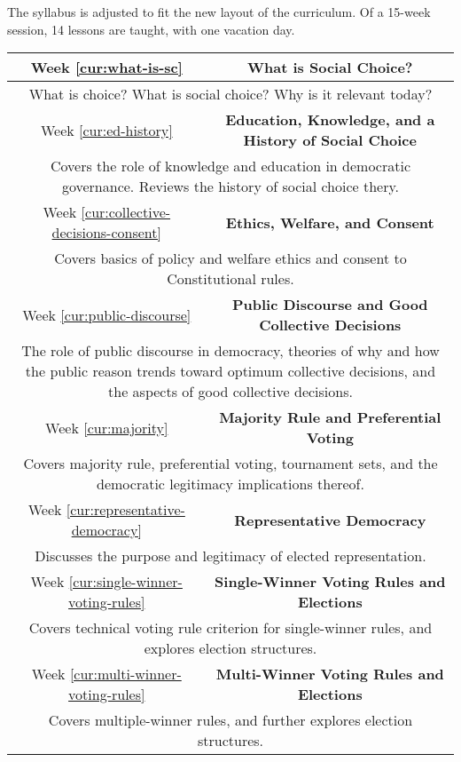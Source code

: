 The syllabus is adjusted to fit the new layout of the curriculum.  Of a 15-week session, 14 lessons are taught, with one vacation day.

{
    \newcommand{\sylweek}[3]{

        Week \ref{cur:#1} & \textbf{#2} \\
        \hline
        \multicolumn{2}{|X|}{\centering
            #3
        } \\
        \hline
    }
    \begin{table}[h]
        \label{syllabus}
        \centering
        \begin{tabularx}{\linewidth}{|c|c|}
            \hline

            \sylweek{what-is-sc}{What is Social Choice?}{What is choice?  What is social choice?  Why is it relevant today?}

            \sylweek{ed-history}{Education, Knowledge, and a History of Social Choice}{Covers the role of knowledge and education in democratic governance.  Reviews the history of social choice thery.}

            \sylweek{collective-decisions-consent}{Ethics, Welfare, and Consent}{Covers basics of policy and welfare ethics and consent to  Constitutional rules.}

            \sylweek{public-discourse}{Public Discourse and Good Collective Decisions}{The role of public discourse in democracy, theories of why and how the public reason trends toward optimum collective decisions, and the aspects of good collective decisions.}

            \sylweek{majority}{Majority Rule and Preferential Voting}{Covers majority rule, preferential voting, tournament sets, and the democratic legitimacy implications thereof.}


            \sylweek{representative-democracy}{Representative Democracy}{Discusses the purpose and legitimacy of elected representation.}

            \sylweek{single-winner-voting-rules}{Single-Winner Voting Rules and Elections}{Covers technical voting rule criterion for single-winner rules, and explores election structures.}

            \sylweek{multi-winner-voting-rules}{Multi-Winner Voting Rules and Elections}{Covers multiple-winner rules, and further explores election structures.}


\end{tabularx}
\end{table}}
